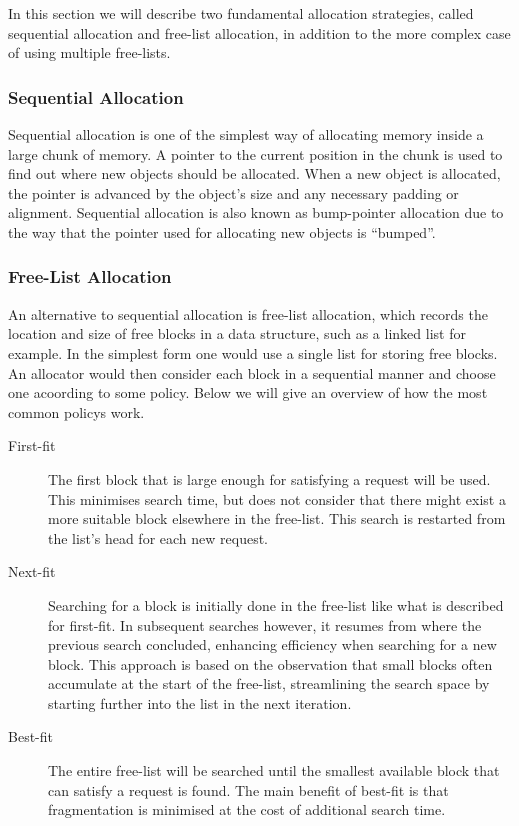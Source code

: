 
In this section we will describe two fundamental allocation strategies, called sequential allocation and free-list allocation, in addition to the more complex case of using multiple free-lists.

\subsubsection{Sequential Allocation}
Sequential allocation is one of the simplest way of allocating memory inside a large chunk of memory. A pointer to the current position in the chunk is used to find out where new objects should be allocated. When a new object is allocated, the pointer is advanced by the object's size and any necessary padding or alignment. Sequential allocation is also known as bump-pointer allocation due to the way that the pointer used for allocating new objects is ``bumped''.


\subsubsection{Free-List Allocation}
An alternative to sequential allocation is free-list allocation, which records the location and size of free blocks in a data structure, such as a linked list for example. In the simplest form one would use a single list for storing free blocks. An allocator would then consider each block in a sequential manner and choose one acoording to some policy. Below we will give an overview of how the most common policys work.

\begin{description}
    \item[First-fit]
        The first block that is large enough for satisfying a request will be used. This minimises search time, but does not consider that there might exist a more suitable block elsewhere in the free-list. This search is restarted from the list's head for each new request. 
    \item[Next-fit]
        Searching for a block is initially done in the free-list like what is described for first-fit. In subsequent searches however, it resumes from where the previous search concluded, enhancing efficiency when searching for a new block. This approach is based on the observation that small blocks often accumulate at the start of the free-list, streamlining the search space by starting further into the list in the next iteration.
    \item[Best-fit]
        The entire free-list will be searched until the smallest available block that can satisfy a request is found. The main benefit of best-fit is that fragmentation is minimised at the cost of additional search time.
\end{description}

